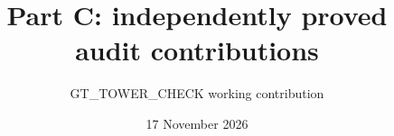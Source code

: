 \documentclass[11pt]{article}
\begin{document}
\title{Part C: independently proved audit contributions}
\author{GT\_TOWER\_CHECK working contribution}
\date{17 November 2026}
\maketitle






\end{document}

